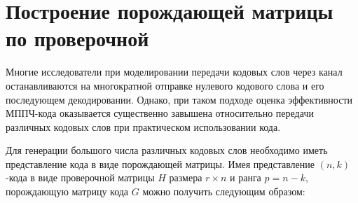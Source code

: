\section{Построение порождающей матрицы по проверочной}

Многие исследователи при моделировании передачи кодовых слов через канал останавливаются на многократной отправке
нулевого кодового слова и его последующем декодировании. Однако, при таком подходе оценка эффективности
МППЧ-кода оказывается существенно завышена относительно передачи различных кодовых слов при практическом использовании
кода.

Для генерации большого числа различных кодовых слов необходимо иметь представление кода в виде
 порождающей матрицы. Имея представление $(n,k)$-кода в виде проверочной матрицы $H$ размера $r \times n$ и
 ранга $p=n-k$, порождающую матрицу кода $G$ можно получить следующим образом:
